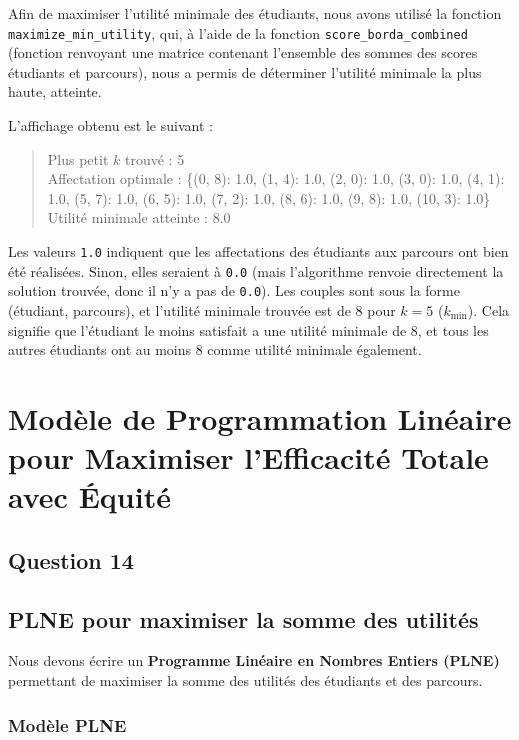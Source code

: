 \documentclass[a4paper,11pt]{article}
\begin{document}
Afin de maximiser l'utilité minimale des étudiants, nous avons utilisé la fonction \texttt{maximize\_min\_utility}, qui, à l'aide de la fonction \texttt{score\_borda\_combined} (fonction renvoyant une matrice contenant l'ensemble des sommes des scores étudiants et parcours), nous a permis de déterminer l'utilité minimale la plus haute, atteinte.

L'affichage obtenu est le suivant :

\begin{quote}
Plus petit \( k \) trouvé : 5\\
Affectation optimale : \{(0, 8): 1.0, (1, 4): 1.0, (2, 0): 1.0, (3, 0): 1.0, (4, 1): 1.0, (5, 7): 1.0, (6, 5): 1.0, (7, 2): 1.0, (8, 6): 1.0, (9, 8): 1.0, (10, 3): 1.0\}\\
Utilité minimale atteinte : 8.0
\end{quote}

Les valeurs \texttt{1.0} indiquent que les affectations des étudiants aux parcours ont bien été réalisées. Sinon, elles seraient à \texttt{0.0} (mais l'algorithme renvoie directement la solution trouvée, donc il n'y a pas de \texttt{0.0}). Les couples sont sous la forme (étudiant, parcours), et l'utilité minimale trouvée est de 8 pour \( k = 5 \) (\( k_{\text{min}} \)). Cela signifie que l'étudiant le moins satisfait a une utilité minimale de 8, et tous les autres étudiants ont au moins 8 comme utilité minimale également.




\section*{Modèle de Programmation Linéaire pour Maximiser l'Efficacité Totale avec Équité}


\subsection*{Question 14}
\subsection{PLNE pour maximiser la somme des utilités}

Nous devons écrire un \textbf{Programme Linéaire en Nombres Entiers (PLNE)} permettant de maximiser la somme des utilités des étudiants et des parcours.

\subsubsection{Modèle PLNE}
\end{document}
